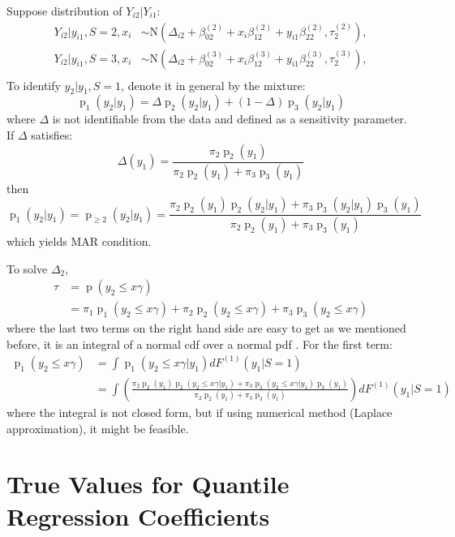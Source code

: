 \documentclass[12pt]{article}
\DeclareMathOperator{\pr}{p}
\begin{document}
Suppose distribution of $Y_{i2} | Y_{i1}$:
\begin{align*}
  Y_{i2} | y_{i1} , S = 2, x_i & \sim \textrm{N}(\Delta_{i2} + \beta_{02}^{(2)} + x_i\beta_{12}^{(2)} + y_{i1}\beta_{22}^{(2)}, \tau_2^{(2)}),  \\
  Y_{i2} | y_{i1} , S = 3, x_i & \sim \textrm{N}(\Delta_{i2} + \beta_{02}^{(3)} + x_i\beta_{12}^{(3)} + y_{i1}\beta_{22}^{(3)}, \tau_2^{(3)}),  \\
\end{align*}
To identify $y_2 | y_1, S = 1$, denote it in general by the mixture:
\begin{displaymath}
  \pr_1(y_2|y_1) = \Delta \pr_2(y_2|y_1) + (1 - \Delta) \pr_3(y_2|y_1)
\end{displaymath}
where $\Delta$ is not identifiable from the data and defined as a
sensitivity parameter. If $\Delta$ satisfies:
\begin{displaymath}
  \Delta(y_1) = \frac{\pi_2 \pr_2(y_1)}{\pi_2\pr_2(y_1) + \pi_3\pr_3(y_1)}
\end{displaymath}
then
\begin{displaymath}
  \pr_1(y_2|y_1) = \pr_{\geq 2} (y_2|y_1) = \frac{\pi_2 \pr_2(y_1) \pr_2(y_2|y_1) + \pi_3\pr_3(y_2|y_1)\pr_3(y_1)}{\pi_2\pr_2(y_1) + \pi_3\pr_3(y_1)}
\end{displaymath}
which yields MAR condition.


To solve $\Delta_2$,
\begin{align*}
  \tau &= \pr (y_2 \leq x\gamma ) \\
  & = \pi_1 \pr_1(y_2 \leq x\gamma) + \pi_2 \pr_2(y_2 \leq x\gamma) + \pi_3 \pr_3(y_2 \leq x\gamma)
\end{align*}
where the last two terms on the right hand side are easy to get as we
mentioned before, it is an integral of a normal cdf over a normal pdf
. For the first term:
\begin{align*}
  \pr_1(y_2 \leq x\gamma) & = \int \pr_{1}(y_2 \leq x\gamma| y_1) dF^{(1)}(y_1|S = 1) \\
  & = \int \left( \frac{\pi_2 \pr_2(y_1) \pr_2(y_2 \leq x\gamma|y_1) + \pi_3\pr_3(y_2 \leq
      x\gamma|y_1)\pr_3(y_1)}{\pi_2\pr_2(y_1) + \pi_3\pr_3(y_1)} \right) dF^{(1)}(y_1|S =
  1)
\end{align*}
where the integral is not closed form, but if using numerical method
(Laplace approximation), it might be feasible.

\section{True Values for Quantile Regression Coefficients}
\end{document}
